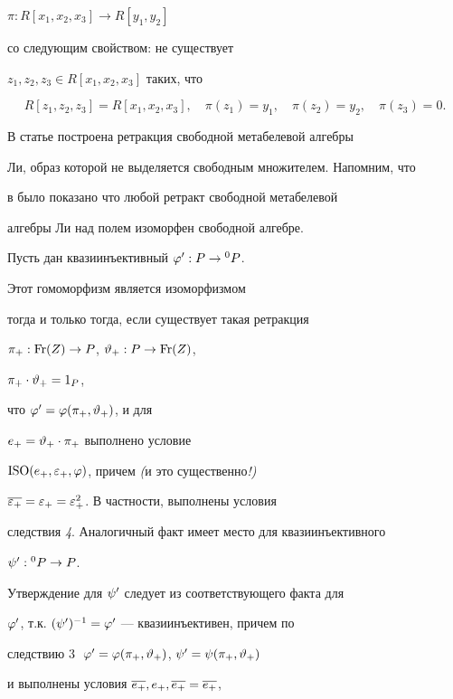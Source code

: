 $\pi: R[x_1,x_2,x_3]\to R[y_1,y_2]$


со следующим свойством: не существует


$z_1,z_2,z_3\in R[x_1,x_2,x_3]$ таких, что


$$


R[z_1,z_2,z_3]= R[x_1,x_2,x_3],\quad


\pi(z_1)=y_1,\quad \pi(z_2)=y_2,\quad \pi(z_3)=0.


$$


В статье \cite{A4} построена ретракция свободной метабелевой алгебры


Ли, образ которой не выделяется свободным множителем. Напомним, что


в \cite{A2} было показано что любой ретракт свободной метабелевой


алгебры Ли над полем изоморфен свободной алгебре.





\begin{thm}


Пусть дан квазиинъективный $\varphi': P\to {}^0 P$.


Этот гомоморфизм является изоморфизмом


тогда и только тогда, если существует такая ретракция


$\pi_{+}: \operatorname{Fr}(Z)\to P$, $\vartheta_{+}: P\to \operatorname{Fr}(Z)$,


$\pi_{+}\cdot\vartheta_{+}=1_P$,


что $\varphi'=\varphi(\pi_{+},\vartheta_{+})$, и для


$e_{+}=\vartheta_{+}\cdot\pi_{+}$ выполнено условие


${\mathrm{ISO}}(e_{+},\varepsilon_{+},\varphi)$, причем {\em (}и это существенно{\em !)}


$\overline{\varepsilon_{+}}=\varepsilon_{+}=\varepsilon^2_{+} $. В частности, выполнены условия


следствия {\em 4}. Аналогичный факт имеет место для квазиинъективного


$\psi': {}^0 P\to P$.


\end{thm}





Утверждение для $\psi'$ следует из соответствующего факта для


$\varphi'$, т.к. $(\psi')^{-1}=\varphi'$ --- квазиинъективен, причем по


следствию 3 $\;\varphi'=\varphi(\pi_{+},\vartheta_{+})$, $\psi'=\psi(\pi_{+},\vartheta_{+})$


и выполнены условия $\overline{e_{+}}, e_{+},\overline{e_{+}}=\overline{e_{+}}$,


